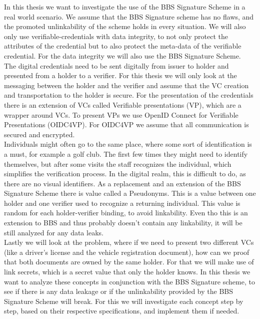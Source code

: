 \documentclass[
	a4paper               %
	,BCOR=0mm            %
	,bibliography=totoc   %
	,listof=totoc         %
	,monolingual
	,twoside=false
]{bfhthesis}              %
\begin{document}
In this thesis we want to investigate the use of the BBS Signature Scheme in a real world scenario.
We assume that the BBS Signature scheme has no flaws, and the promoted unlinkability of the scheme holds in every situation.
We will also only use verifiable-credentials with data integrity, to not only protect the attributes of the credential but to also protect the meta-data of the verifiable credential. For the data integrity we will also use the BBS Signature Scheme.\\

The digital credentials need to be sent digitally from issuer to holder and presented from a holder to a verifier. 
For this thesis we will only look at the messaging between the holder and the verifier and assume that the VC creation and transportation to the holder is secure.
For the presentation of the credentials there is an extension of VCs called Verifiable presentations (VP)\cite{verifiable-credentials}, which are a wrapper around VCs.
To present VPs we use OpenID Connect for Verifiable Presentations (OIDC4VP)\cite{oidc4vp}.
For OIDC4VP we assume that all communication is secured and encrypted.\\

Individuals might often go to the same place, where some sort of identification is a must, for example a golf club. The first few times they might need to identify themselves, but after some visits the staff recognizes the individual, which simplifies the verification process. In the digital realm, this is difficult to do, as there are no visual identifiers. As a replacement and an extension of the BBS Signature Scheme there is value called a Pseudonyms\cite{pseudonyms}. This is a value between one holder and one verifier used to recognize a returning individual. This value is random for each holder-verifier binding, to avoid linkability. Even tho this is an extension to BBS and thus probably doesn't contain any linkability, it will be still analyzed for any data leaks. \\


Lastly we will look at the problem, where if we need to present two different VCs (like a driver's license and the vehicle registration document), how can we proof that both documents are owned by the same holder.
For that we will make use of link secrets\cite{linksecrets}, which is a secret value that only the holder knows.
In this thesis we want to analyze these concepts in conjunction with the BBS Signature scheme, to see if there is any data leakage or if the unlinkability provided by the BBS Signature Scheme will break.
For this we will investigate each concept step by step, based on their respective specifications, and implement them if needed.
\end{document}
